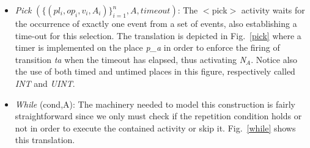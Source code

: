 \begin{itemize}
\item {\it Pick} $(\{(pl_i,op_i,v_i,A_i)\}_{i=1}^n,A,timeout)$: The $<$pick$>$ activity waits for the occurrence of exactly one event from a set of events, also establishing a
time-out for this selection. The translation is depicted in Fig.~\ref{pick} where a timer is implemented on the place {\it p\_a} in order to enforce the firing of transition {\it ta} when the timeout has elapsed, thus activating {\it N$_{A}$}. Notice also the use of both timed and untimed places in this figure, respectively called {\it INT} and {\it UINT}.  %


\item {\it While} (cond,A): The machinery needed to model this construction is fairly straightforward since we only must check if the repetition condition holds or not in order to execute the contained activity or skip it. Fig.~\ref{while} shows this translation.
\end{itemize}

